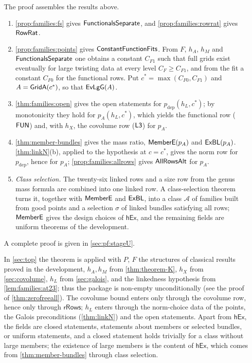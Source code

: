 \begin{proofoutline}
The proof assembles the results above.
\begin{enumerate}[label=\arabic*.]
\item \cref{prop:families:fs} gives $\mathsf{FunctionalsSeparate}$, and \cref{prop:families:rowrat} gives
$\mathsf{RowRat}$.
\item \cref{prop:families:points} gives $\mathsf{ConstantFunctionFits}$. From $F$, $h_A$, $h_M$ and
$\mathsf{FunctionalsSeparate}$ one obtains a constant $C_{F1}$ such that full grids exist eventually for large
twisting data at every level $C_F\ge C_{F1}$, and from the fit a constant $C_{F0}$ for the functional rows. Put
$c^*=\max(C_{F0},C_{F1})$ and $A=\mathsf{GridA}(c^*)$, so that $\mathsf{EvLgG}(A)$.
\item \cref{thm:families:open} gives the open statements for $p_{\mathrm{dep}}(h_L,c^*)$; by monotonicity they hold
for $p_A(h_L,c^*)$, which yields the functional row ($\mathsf{FUN}$) and, with $h_X$, the covolume row
($\mathsf{L3}$) for $p_A$.
\item \cref{thm:member-bundles} gives the mass ratio, $\mathsf{MemberE}(p_A)$ and $\mathsf{ExBL}(p_A)$.
\cref{thm:linkN}(b), applied to the hypothesis at $c=c^*$, gives the norm row for $p_{\mathrm{dep}}$, hence for
$p_A$; \cref{prop:families:allrows} gives $\mathsf{AllRowsAlt}$ for $p_A$.
\item \emph{Class selection.} The twenty-six linked rows and a size row from the genus mass formula are combined
into one linked row. A class-selection theorem turns it, together with $\mathsf{MemberE}$ and $\mathsf{ExBL}$, into
a class $\mathcal A$ of families built from good points and a selection $\sigma$ of linked bundles satisfying
all rows; $\mathsf{MemberE}$ gives the design choices of $\mathsf{hEx}$, and the remaining fields are uniform
theorems of the development.\qedhere
\end{enumerate}

A complete proof is given in \cref{sec:pf:stageU}.
\end{proofoutline}

\begin{remark}\label{rem:families:supply}
In \cref{sec:top} the theorem is applied with $P$, $F$ the structures of classical results proved in the
development, $h_A,h_M$ from \cref{thm:theorem-K}, $h_X$ from \cref{sec:covolume}, $h_L$ from \cref{sec:galois}, and
the linkedness hypothesis from \cref{lem:families:at23}; thus the package is non-empty unconditionally
(see the proof of \cref{thm:zerofreeall}). The covolume bound enters only through the covolume row, hence only through
$\mathsf{rRows}$; $h_L$ enters through the norm-choice data of the points, the Galois preconditions
(\cref{thm:linkN}) and the open statements. Apart from $\mathsf{hEx}$, the fields are closed statements,
statements about members or selected bundles, or uniform statements, and a closed statement holds trivially for
a class without large members; the existence of large members is the content of $\mathsf{hEx}$, which comes from
\cref{thm:member-bundles} through class selection.
\end{remark}

